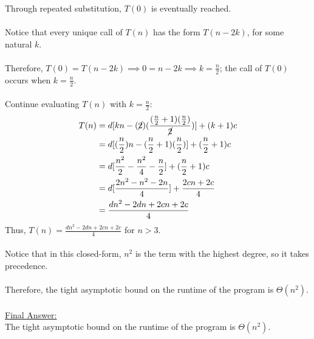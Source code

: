 \documentclass[12pt]{article}
\begin{document}
Through repeated substitution, $T(0)$ is eventually reached. \\
\\
Notice that every unique call of $T(n)$ has the form $T(n - 2k)$, for some natural $k$. \\
\\
Therefore, $T(0) = T(n - 2k) \implies 0 = n - 2k \implies k = \frac{n}{2}$; the call of $T(0)$ occurs when $k = \frac{n}{2}$. \\
\\
Continue evaluating $T(n)$ with $k = \frac{n}{2}$:
\begin{equation*}
    \begin{aligned}
        T(n) &= d[kn - (\cancel{2})(\frac{(\frac{n}{2} + 1)(\frac{n}{2})}{\cancel{2}})] + (k + 1)c \\
        &= d[(\frac{n}{2})n - (\frac{n}{2} + 1)(\frac{n}{2})] + (\frac{n}{2} + 1)c \\
        &= d[\frac{n^2}{2} - \frac{n^2}{4} - \frac{n}{2}] + (\frac{n}{2} + 1)c \\
        &= d[\frac{2n^2 - n^2 - 2n}{4}] + \frac{2cn + 2c}{4} \\
        &= \frac{dn^2 - 2dn + 2cn + 2c}{4}
    \end{aligned}
\end{equation*}
Thus, $T(n) = \frac{dn^2 - 2dn + 2cn + 2c}{4}$ for $n > 3$. \\
\\
Notice that in this closed-form, $n^2$ is the term with the highest degree, so it takes precedence. \\
\\
Therefore, the tight asymptotic bound on the runtime of the program is $\Theta (n^2)$. \\
\\
\underline{Final Answer:} \\
The tight asymptotic bound on the runtime of the program is $\Theta (n^2)$. \\
\end{document}
